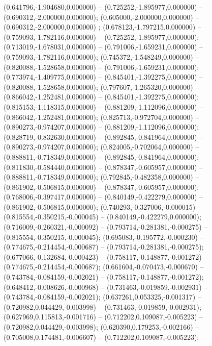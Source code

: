  (0.641796,-1.904680,0.000000) -- (0.725252,-1.895977,0.000000) -- (0.690312,-2.000000,0.000000);
 (0.605000,-2.000000,0.000000) -- (0.690312,-2.000000,0.000000) ;
 (0.678123,-1.797215,0.000000) -- (0.759093,-1.782116,0.000000) -- (0.725252,-1.895977,0.000000);
 (0.713019,-1.678031,0.000000) -- (0.791006,-1.659231,0.000000) -- (0.759093,-1.782116,0.000000);
 (0.745372,-1.548249,0.000000) -- (0.820088,-1.528658,0.000000) -- (0.791006,-1.659231,0.000000);
 (0.773974,-1.409775,0.000000) -- (0.845401,-1.392275,0.000000) -- (0.820088,-1.528658,0.000000);
 (0.797607,-1.265320,0.000000) -- (0.866042,-1.252481,0.000000) -- (0.845401,-1.392275,0.000000);
 (0.815153,-1.118315,0.000000) -- (0.881209,-1.112096,0.000000) -- (0.866042,-1.252481,0.000000);
 (0.825713,-0.972704,0.000000) -- (0.890273,-0.974207,0.000000) -- (0.881209,-1.112096,0.000000);
 (0.828719,-0.832630,0.000000) -- (0.892845,-0.841964,0.000000) -- (0.890273,-0.974207,0.000000);
 (0.824005,-0.702064,0.000000) -- (0.888811,-0.718349,0.000000) -- (0.892845,-0.841964,0.000000);
 (0.811830,-0.584440,0.000000) -- (0.878347,-0.605957,0.000000) -- (0.888811,-0.718349,0.000000);
 (0.792845,-0.482358,0.000000) -- (0.861902,-0.506815,0.000000) -- (0.878347,-0.605957,0.000000);
 (0.768006,-0.397417,0.000000) -- (0.840149,-0.422279,0.000000) -- (0.861902,-0.506815,0.000000);
 (0.740293,-0.327006,-0.000015) -- (0.815554,-0.350215,-0.000045) -- (0.840149,-0.422279,0.000000);
 (0.716009,-0.260321,-0.000092) -- (0.793714,-0.281381,-0.000275) -- (0.815554,-0.350215,-0.000045);
 (0.695083,-0.195772,-0.000230) -- (0.774675,-0.214454,-0.000687) -- (0.793714,-0.281381,-0.000275);
 (0.677066,-0.132684,-0.000423) -- (0.758117,-0.148877,-0.001272) -- (0.774675,-0.214454,-0.000687);
 (0.661604,-0.070473,-0.000670) -- (0.743784,-0.084159,-0.002021) -- (0.758117,-0.148877,-0.001272);
 (0.648412,-0.008626,-0.000968) -- (0.731463,-0.019859,-0.002931) -- (0.743784,-0.084159,-0.002021);
 (0.637261,0.053325,-0.001317) -- (0.720982,0.044429,-0.003998) -- (0.731463,-0.019859,-0.002931);
 (0.627969,0.115813,-0.001716) -- (0.712202,0.109087,-0.005223) -- (0.720982,0.044429,-0.003998);
 (0.620390,0.179253,-0.002166) -- (0.705008,0.174481,-0.006607) -- (0.712202,0.109087,-0.005223);
